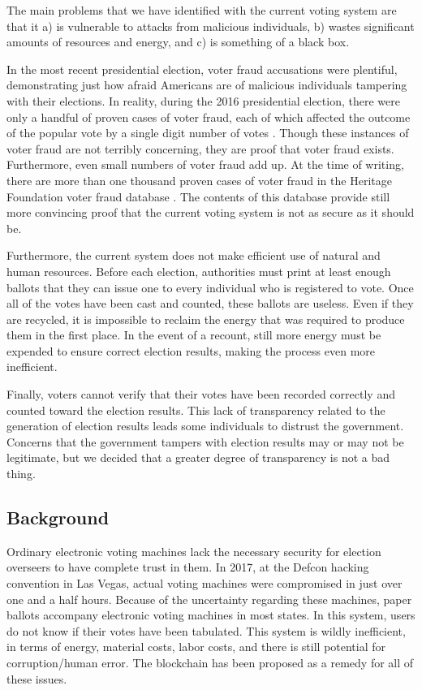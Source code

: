 \documentclass[conference]{IEEEtran}
\begin{document}
The main problems that we have identified with the current voting system are that it a) is vulnerable to attacks from malicious individuals, b) wastes significant amounts of resources and energy, and c) is something of a black box.

In the most recent presidential election, voter fraud accusations were plentiful,
demonstrating just how afraid Americans are of malicious individuals
tampering with their elections. In reality, during the 2016 presidential
election, there were only a handful of proven cases of voter fraud, each of
which affected the outcome of the popular vote by a single digit number of
votes \cite{b1}. Though these instances of voter fraud are not terribly
concerning, they are proof that voter fraud exists. Furthermore, even small
numbers of voter fraud add up. At the time of writing, there are more than
one thousand proven cases of voter fraud in the Heritage Foundation voter
fraud database \cite{b2}. The contents of this database provide still more
convincing proof that the current voting system is not as secure as it
should be.

Furthermore, the current system does not make efficient use of natural and
human resources. Before each election, authorities must print at least
enough ballots that they can issue one to every individual who is
registered to vote. Once all of the votes have been cast and counted, these
ballots are useless. Even if they are recycled, it is impossible to reclaim
the energy that was required to produce them in the first place. In the
event of a recount, still more energy must be expended to ensure correct
election results, making the process even more inefficient.

Finally, voters cannot verify that their votes have been
recorded correctly and counted toward the election results. This lack of
transparency related to the generation of election results leads some
individuals to distrust the government. Concerns that the government
tampers with election results may or may not be legitimate, but we decided
that a greater degree of transparency is not a bad thing.

\subsection{Background}

Ordinary electronic voting machines lack the necessary security for election overseers to have complete trust in them. In 2017, at the Defcon hacking convention in Las Vegas, actual voting machines were compromised in just over one and a half hours. Because of the uncertainty regarding these machines, paper ballots accompany electronic voting machines in most states. In this system, users do not know if their votes have been tabulated. This system is wildly inefficient, in terms of energy, material costs, labor costs, and there is still potential for corruption/human error. The blockchain has been proposed as a remedy for all of these issues.
\end{document}
